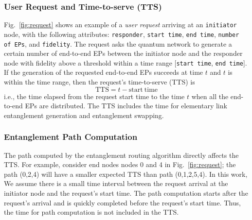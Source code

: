 \subsubsection{User Request and Time-to-serve (TTS)} 
Fig.~\ref{fig:request} shows an example of a \emph{user request} arriving
at an \texttt{initiator} node, with the following attributes: \texttt{responder}, \texttt{start time}, \texttt{end time}, \texttt{number of EPs}, and \texttt{fidelity}.
The request asks the quantum network to generate a certain number of end-to-end EPs between the initiator node and the responder node with fidelity above a threshold within a time range [\texttt{start time}, \texttt{end time}].
If the generation of the requested end-to-end EPs succeeds at time $t$ and $t$ is within the time range, then the request's time-to-serve (TTS) is
\begin{equation}
    \mathrm{TTS} = t - \mathrm{start~time}
    \label{eqn:tts}
\end{equation}
i.e., the time elapsed from the request start time to the time $t$ when all the end-to-end EPs are distributed.
The TTS includes the time for elementary link entanglement generation and entanglement swapping.


\subsubsection{Entanglement Path Computation} 
The path computed by the entanglement routing algorithm directly affects the TTS. 
For example, consider end nodes nodes 0 and 4 in Fig.~\ref{fig:request}; 
the path (0,2,4) will have a smaller expected TTS than path (0,1,2,5,4).
In this work, %
We assume there is a small time interval between the request arrival at the initiator node and the request's start time.
The path computation starts after the request's arrival and is quickly completed before the request's start time.
Thus, the time for path computation is not included in the TTS. %

